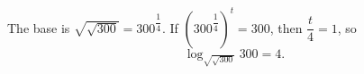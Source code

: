 The base is $\sqrt{\sqrt{300}}=300^{\dfrac{1}{4}}$. If $\left(300^{\dfrac{1}{4}}\right)^t=300$, then $\dfrac{t}{4}=1$, so
\[
\log_{\sqrt{\sqrt{300}}}300=\boxed{4}.
\]
